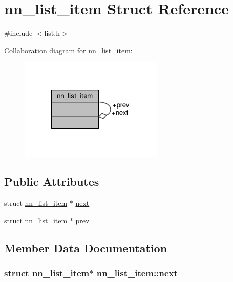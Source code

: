 \hypertarget{structnn__list__item}{}\section{nn\+\_\+list\+\_\+item Struct Reference}
\label{structnn__list__item}


{\ttfamily \#include $<$list.\+h$>$}



Collaboration diagram for nn\+\_\+list\+\_\+item\+:\nopagebreak
\begin{figure}[H]
\begin{center}
\leavevmode
\includegraphics[width=194pt]{structnn__list__item__coll__graph}
\end{center}
\end{figure}
\subsection*{Public Attributes}
\begin{DoxyCompactItemize}
\item 
struct \hyperlink{structnn__list__item}{nn\+\_\+list\+\_\+item} $\ast$ \hyperlink{structnn__list__item_aeeacd653dc43eb9b8b75a71d3839e04c}{next}
\item 
struct \hyperlink{structnn__list__item}{nn\+\_\+list\+\_\+item} $\ast$ \hyperlink{structnn__list__item_ac6050ca0b2db2385edf95926b9103ea2}{prev}
\end{DoxyCompactItemize}


\subsection{Member Data Documentation}
\subsubsection[{next}]{\setlength{\rightskip}{0pt plus 5cm}struct {\bf nn\+\_\+list\+\_\+item}$\ast$ nn\+\_\+list\+\_\+item\+::next}\hypertarget{structnn__list__item_aeeacd653dc43eb9b8b75a71d3839e04c}{}\label{structnn__list__item_aeeacd653dc43eb9b8b75a71d3839e04c}
